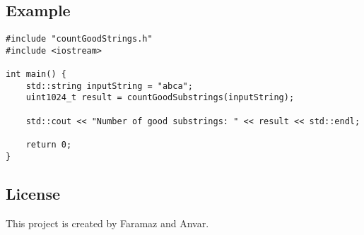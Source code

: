 \documentclass{article}
\begin{document}
\subsection*{Example}

\begin{verbatim}
#include "countGoodStrings.h"
#include <iostream>

int main() {
    std::string inputString = "abca";
    uint1024_t result = countGoodSubstrings(inputString);

    std::cout << "Number of good substrings: " << result << std::endl;

    return 0;
}
\end{verbatim}

\subsection*{License}

This project is created by Faramaz and Anvar.
\end{document}
